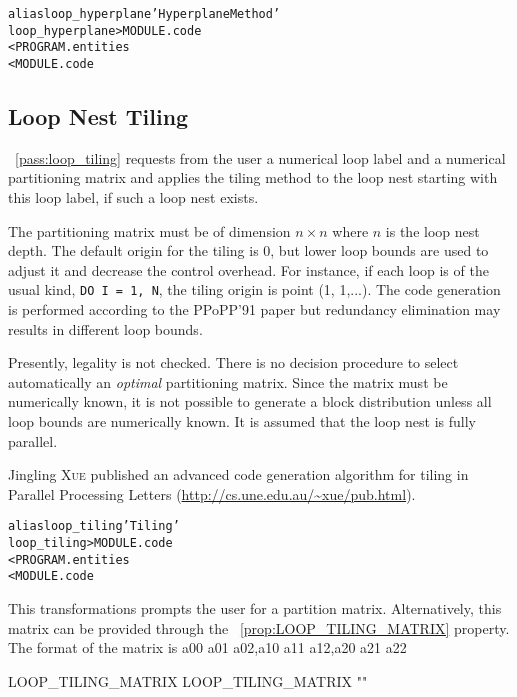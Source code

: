 \documentclass[a4paper]{report}
\newenvironment{PipsMake}{\begin{alltt}}{\end{alltt}}
\newcommand{\PipsPropRef}[1]{\texttt{\detokenize{#1}}~\ref{prop:#1}}
\newcommand{\PipsPassRef}[1]{\texttt{\detokenize{#1}}~\ref{pass:#1}}
\newenvironment{PipsPass}[1]{\label{pass:#1}}{}
\begin{document}
\begin{PipsMake}
alias loop_hyperplane 'Hyperplane Method'
loop_hyperplane                            > MODULE.code
        < PROGRAM.entities
        < MODULE.code
\end{PipsMake}

\subsection{Loop Nest Tiling}
\label{subsection-loop-nest-tiling}

\begin{PipsPass}{loop_tiling}
\PipsPassRef{loop_tiling} requests from the user a numerical loop label and a
numerical partitioning matrix and applies the tiling method to the loop
nest starting with this loop label, if such a loop nest exists.

The partitioning matrix must be of dimension $n \times n$ where $n$ is the
loop nest depth. The default origin for the tiling is 0, but lower loop
bounds are used to adjust it and decrease the control overhead. For
instance, if each loop is of the usual kind, \verb+DO I = 1, N+, the
tiling origin is point (1, 1,...). The code generation is performed
according to the PPoPP'91 paper but redundancy elimination may results in
different loop bounds.

Presently, legality is not checked. There is no decision procedure to
select automatically an {\em optimal} partitioning matrix. Since the
matrix must be numerically known, it is not possible to generate a block
distribution unless all loop bounds are numerically known. It is assumed
that the loop nest is fully parallel.

Jingling \textsc{Xue} published an advanced code generation algorithm for
tiling in Parallel Processing Letters
(\url{http://cs.une.edu.au/~xue/pub.html}).
\end{PipsPass}

\begin{PipsMake}
alias loop_tiling 'Tiling'
loop_tiling                            > MODULE.code
        < PROGRAM.entities
        < MODULE.code
\end{PipsMake}

This transformations prompts the user for a partition matrix.
Alternatively, this matrix can be provided through the \PipsPropRef{LOOP_TILING_MATRIX} property.
The format of the matrix is a00 a01 a02,a10 a11 a12,a20 a21 a22
\begin{PipsProp}{LOOP_TILING_MATRIX}
LOOP_TILING_MATRIX ""
\end{PipsProp}
\end{document}
